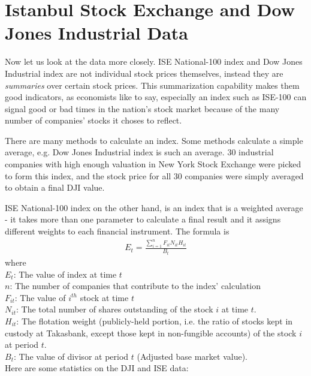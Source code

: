 \section{Istanbul Stock Exchange and Dow Jones Industrial Data}

Now let us look at the data more closely. ISE National-100 index and Dow Jones
Industrial index are not individual stock prices themselves, instead they are
{\em summaries} over certain stock prices. This summarization capability makes
them good indicators, as economists like to say, especially an index such as
ISE-100 can signal good or bad times in the nation's stock market because of the
many number of companies' stocks it choses to reflect.

There are many methods to calculate an index. Some methods calculate a simple
average, e.g. Dow Jones Industrial index is such an average. 30 industrial
companies with high enough valuation in New York Stock Exchange were picked to
form this index, and the stock price for all 30 companies were simply averaged
to obtain a final DJI value.

ISE National-100 index on the other hand, is an index that is a weighted average
- it takes more than one parameter to calculate a final result and it assigns
different weights to each financial instrument. The formula is
\begin{eqnarray*}
E_t = \frac{\sum_{i=1}^n F_{it} N_{it} H_{it}}{B_t}
\end{eqnarray*}
where\\
$E_t$: The value of index at time $t$\\
$n$: The number of companies that contribute to the index' calculation\\
$F_{it}$: The value of $i^{th}$ stock at time $t$\\
$N_{it}$: The total number of shares outstanding of the stock $i$ at time $t$. \\
$H_{it}$: The flotation weight (publicly-held portion, i.e. the ratio of stocks
kept in custody at Takasbank, except those kept in non-fungible accounts) of the
stock $i$ at period $t$. \\
$B_t$: The value of divisor at period $t$ (Adjusted base market value). \\

Here are some statistics on the DJI and ISE data:

\vspace{0.3cm}

